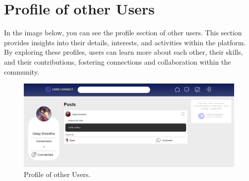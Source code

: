 \section{Profile of other Users}
In the image below, you can see the profile section of other users. This section provides insights into their details, interests, and activities within the platform. By exploring these profiles, users can learn more about each other, their skills, and their contributions, fostering connections and collaboration within the community.
\begin{figure}[ht]
    \centering
    \includegraphics[width=1\textwidth]{Outcome-ss/other-user-profile.png}
    \caption{Profile of other Users.}
    \label{fig:Profile of other Users}
\end{figure}
\newpage

